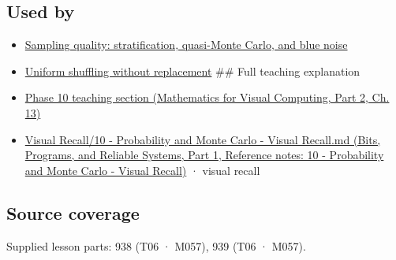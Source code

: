 \subsection{Used by}\label{appendix-daaf25bfd3a0-used-by}

\hypertarget{appendix-daaf25bfd3a0-used-by}{}

\begin{itemize}
\item
  \hyperref[appendix-9f693ffd82bc]{Sampling quality: stratification, quasi-Monte Carlo, and blue noise}
\item
  \hyperref[appendix-184fcc411663]{Uniform shuffling without replacement} \#\# Full teaching explanation
\item
  \href{../02-Mathematics-for-Visual-Computing-P02/main.pdf\#02-foundations-ii-ch029-a-computer-produces-deterministic-pseudorandom-sequences}{Phase 10 teaching section (Mathematics for Visual Computing, Part 2, Ch. 13)}
\item
  \href{../01-Bits-Programs-and-Reliable-Systems-P01/main.pdf\#appendix-cb5af353ef77}{Visual Recall/10 - Probability and Monte Carlo - Visual Recall.md (Bits, Programs, and Reliable Systems, Part 1, Reference notes: 10 - Probability and Monte Carlo - Visual Recall)} · visual recall
\end{itemize}

\subsection{Source coverage}\label{appendix-daaf25bfd3a0-source-coverage}

\hypertarget{appendix-daaf25bfd3a0-source-coverage}{}

Supplied lesson parts: 938 (T06 · M057), 939 (T06 · M057).
